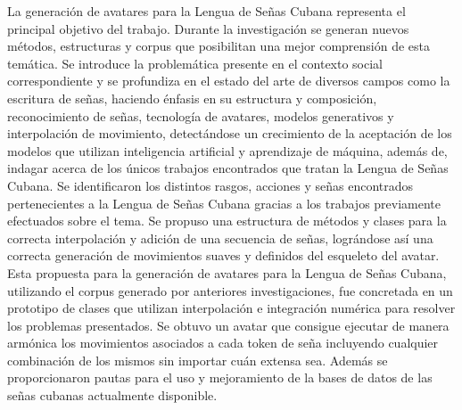\begin{conclusions}


  La generación de avatares para la Lengua de Señas Cubana representa el principal objetivo del trabajo. Durante la investigación se generan nuevos métodos, estructuras y corpus que posibilitan una mejor comprensión de esta temática.
   Se introduce la problemática presente en el contexto social correspondiente y se profundiza en el estado del arte de diversos campos como la escritura de señas, haciendo énfasis en su estructura y composición, reconocimiento de señas, tecnología de avatares, modelos generativos y  interpolación de movimiento, detectándose un crecimiento de la aceptación de los modelos que utilizan inteligencia artificial y  aprendizaje de máquina, además de, indagar acerca de los únicos trabajos encontrados que tratan la Lengua de Señas Cubana.
   Se identificaron los distintos rasgos, acciones y señas encontrados pertenecientes a la Lengua de Señas Cubana gracias a los trabajos previamente efectuados sobre el tema.
   Se propuso una estructura de métodos y clases para la correcta interpolación y adición de una secuencia de señas, lográndose así una correcta generación de movimientos suaves y definidos del esqueleto del avatar. Esta propuesta para la generación de avatares para la Lengua de Señas Cubana, utilizando el corpus generado por anteriores investigaciones, fue concretada en un prototipo de clases que utilizan interpolación e integración numérica para resolver los problemas presentados.
 	Se obtuvo un avatar que consigue ejecutar de manera armónica los movimientos asociados a cada token de seña incluyendo cualquier combinación de los mismos sin importar cuán extensa sea. Además se proporcionaron pautas para el uso y mejoramiento de la bases de datos de las señas cubanas actualmente disponible.

\end{conclusions}
